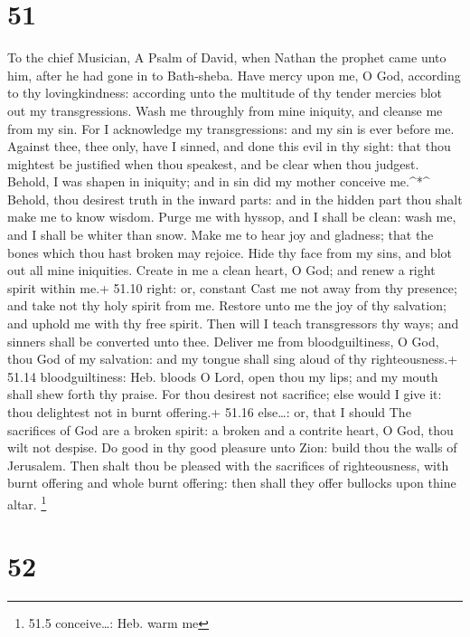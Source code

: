 \hypertarget{section-50}{%
\section{51}\label{section-50}}

To the chief Musician, A Psalm of David, when Nathan the prophet came
unto him, after he had gone in to Bath-sheba.  Have mercy
upon me, O God, according to thy lovingkindness: according unto the
multitude of thy tender mercies blot out my transgressions. 
Wash me throughly from mine iniquity, and cleanse me from my sin.
 For I acknowledge my transgressions: and my sin is ever
before me.  Against thee, thee only, have I sinned, and done
this evil in thy sight: that thou mightest be justified when thou
speakest, and be clear when thou judgest.  Behold, I was
shapen in iniquity; and in sin did my mother conceive me.\^{}*\^{}
 Behold, thou desirest truth in the inward parts: and in the
hidden part thou shalt make me to know wisdom.  Purge me
with hyssop, and I shall be clean: wash me, and I shall be whiter than
snow.  Make me to hear joy and gladness; that the bones
which thou hast broken may rejoice.  Hide thy face from my
sins, and blot out all mine iniquities.  Create in me a
clean heart, O God; and renew a right spirit within me.+ 51.10 right:
or, constant  Cast me not away from thy presence; and take
not thy holy spirit from me.  Restore unto me the joy of
thy salvation; and uphold me with thy free spirit.  Then
will I teach transgressors thy ways; and sinners shall be converted unto
thee.  Deliver me from bloodguiltiness, O God, thou God of
my salvation: and my tongue shall sing aloud of thy righteousness.+
51.14 bloodguiltiness: Heb. bloods  O Lord, open thou my
lips; and my mouth shall shew forth thy praise.  For thou
desirest not sacrifice; else would I give it: thou delightest not in
burnt offering.+ 51.16 else\ldots: or, that I should  The
sacrifices of God are a broken spirit: a broken and a contrite heart, O
God, thou wilt not despise.  Do good in thy good pleasure
unto Zion: build thou the walls of Jerusalem.  Then shalt
thou be pleased with the sacrifices of righteousness, with burnt
offering and whole burnt offering: then shall they offer bullocks upon
thine altar. \footnote{51.5 conceive\ldots: Heb. warm me}

\hypertarget{section-51}{%
\section{52}\label{section-51}}

